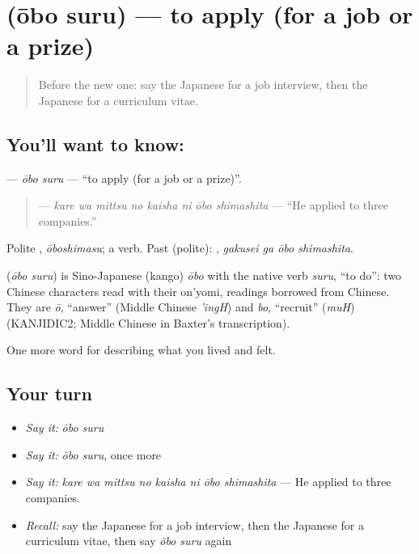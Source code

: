 \section[\texorpdfstring{\ja{おうぼする} (ōbo suru)}{おうぼする (ōbo suru)}]{ (ōbo suru) — to apply (for a job or a prize)}

\label{lesson:JA-C457-oubo-suru}



\begin{quote}
Before the new one: say the Japanese for a job interview, then the Japanese for a curriculum vitae.
\end{quote}

\subsection*{You'll want to know: }
\textbf{} — \emph{ōbo suru} — \textquotedblleft{}to apply (for a job or a prize)\textquotedblright{}.

\begin{quote}
\textbf{   } — \emph{kare wa mittsu no kaisha ni ōbo shimashita} — \textquotedblleft{}He applied to three companies.\textquotedblright{}
\end{quote}

Polite \textbf{}, \emph{ōboshimasu}; a  verb. Past (polite): \textbf{ }, \emph{gakusei ga ōbo shimashita}.

\begin{cousinweb}
\textbf{} (\emph{ōbo suru}) is Sino-Japanese (kango) \emph{ōbo} with the native verb \emph{suru}, \textquotedblleft{}to do\textquotedblright{}: two Chinese characters read with their on'yomi, readings borrowed from Chinese. They are \emph{ō}, \textquotedblleft{}answer\textquotedblright{} (Middle Chinese \emph{'ingH}) and \emph{bo}, \textquotedblleft{}recruit\textquotedblright{} (\emph{muH}) (KANJIDIC2; Middle Chinese in Baxter's transcription).
\end{cousinweb}

\begin{grammarlens}[title={What you've built}]
One more word for describing what you lived and felt.
\end{grammarlens}

\subsection*{Your turn}
\begin{itemize}
\raggedright
  \item \emph{Say it:} \emph{ōbo suru}
  \item \emph{Say it:} \emph{ōbo suru}, once more
  \item \emph{Say it:} \emph{kare wa mittsu no kaisha ni ōbo shimashita} — He applied to three companies.
  \item \emph{Recall:} say the Japanese for a job interview, then the Japanese for a curriculum vitae, then say \emph{ōbo suru} again
\end{itemize}

